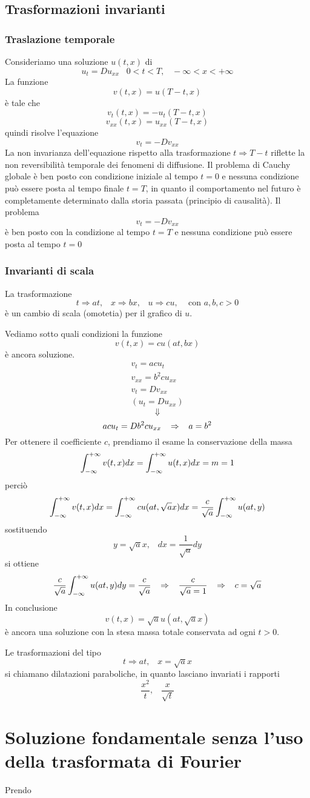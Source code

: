 \subsection{Trasformazioni invarianti}
\subsubsection{Traslazione temporale}
Consideriamo una soluzione $u(t,x)$ di 
\[
	u_t= Du_{xx} \;\;\; 0< t< T, \;\;\; - \infty <x < +\infty
\]
La funzione
\[
	v(t,x)= u(T-t,x)
\]
\`e tale che 
\[
	v_t(t,x)= -u_t(T-t, x)
\]
\[
	v_{xx}(t, x)= u_{xx}(T-t,x)
\]
quindi risolve l'equazione
\[
	v_t= -Dv_{xx}
\]
La non invarianza dell'equazione rispetto alla trasformazione $t \Rightarrow T-t$
riflette la non reversibilit\`a temporale dei fenomeni di diffusione.
Il problema di Cauchy globale \`e ben posto con condizione iniziale al tempo 
$t=0$ e nessuna condizione pu\`o essere posta al tempo finale $t=T$, in quanto il comportamento nel futuro \`e completamente determinato dalla storia passata
(principio di causalit\`a).
Il problema 
\[
	v_t= -Dv_{xx}
\]
\`e ben posto con la condizione al tempo $t=T$ e nessuna condizione pu\`o essere posta al tempo $t=0$
\subsubsection{Invarianti di scala}
La trasformazione
\[
	t\Rightarrow at, \;\;\; x \Rightarrow bx, \;\;\; u\Rightarrow cu,
	\;\;\;
	\text{ con }
	a,b,c>0
\]
\`e un cambio di scala (omotetia) per il grafico di $u$.

Vediamo sotto quali condizioni la funzione
\[
	v(t,x)= cu(at, bx)
\]
\`e ancora soluzione.
\[
	\begin{array}{l}
		v_t= acu_t \\
		v_{xx}= b^2 c u_{xx}  \\
		v_t= Dv_{xx} \\
		\left( u_t= Du_{xx} \right)
	\end{array}
\]
\[
	\Downarrow
\]
\[
	acu_t= Db^2 c u_{xx} \;\;\; \Rightarrow \;\;\; a=b^2
\]
Per ottenere il coefficiente $c$, prendiamo il esame la conservazione della 
massa
\[
	\int_{- \infty}^{+ \infty} v(t,x) dx = \int_{- \infty}^{+ \infty} u(t,x) dx = m= 1
\]
perci\`o
\[
	\int_{- \infty}^{+ \infty} v(t,x) dx=
	\int_{- \infty}^{+ \infty} cu(at, \sqrt{a}x) dx= \frac{c}{\sqrt{a}}
	\int_{- \infty}^{+ \infty} u(at,y)
\]
sostituendo
\[
	y=\sqrt{a}x, \;\;\; dx= \frac{1}{\sqrt{a}}dy
\]
si ottiene
\[
	\frac{c}{\sqrt{a}}
	\int_{- \infty}^{+ \infty} u(at,y)dy= \frac{c}{\sqrt{a}}
	\;\;\; \Rightarrow \;\;\;
	\frac{c}{\sqrt{a}=1}
	\;\;\; \Rightarrow \;\;\;
	c=\sqrt{a}
\]
In conclusione
\[
	v(t,x)= \sqrt{a}u(at, \sqrt{a}x)
\]
\`e ancora una soluzione con la stesa massa totale conservata ad ogni $t>0$.

Le trasformazioni del tipo
\[
	t\Rightarrow at, \;\;\; x=\sqrt{a} x
\]
si chiamano dilatazioni paraboliche, in quanto lasciano invariati i rapporti
\[
	\frac{x^2}{t}, \;\;\; \frac{x}{\sqrt{t}}
\]
\section{Soluzione fondamentale senza l'uso della trasformata di Fourier}
Prendo

